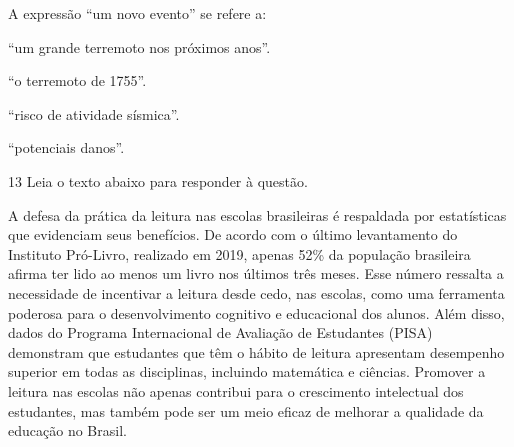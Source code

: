 
A expressão ``um novo evento'' se refere a:

\begin{escolha}
  
  \item ``um grande terremoto nos próximos anos''.
  
  \item ``o terremoto de 1755''.
  
  \item ``risco de atividade sísmica''.
  
  \item ``potenciais danos''.

\end{escolha}

\pagebreak

\num{13} Leia o texto abaixo para responder à questão. 

\begin{myquote}

A defesa da prática da leitura nas escolas brasileiras é respaldada por
estatísticas que evidenciam seus benefícios. De acordo com o último
levantamento do Instituto Pró-Livro, realizado em 2019, apenas 52\% da
população brasileira afirma ter lido ao menos um livro nos últimos três meses.
Esse número ressalta a necessidade de incentivar a leitura desde cedo, nas
escolas, como uma ferramenta poderosa para o desenvolvimento cognitivo e
educacional dos alunos. Além disso, dados do Programa Internacional de
Avaliação de Estudantes (PISA) demonstram que estudantes que têm o hábito de
leitura apresentam desempenho superior em todas as disciplinas, incluindo
matemática e ciências. Promover a leitura nas escolas não apenas
contribui para o crescimento intelectual dos estudantes, mas também pode ser
um meio eficaz de melhorar a qualidade da educação no Brasil.

\end{myquote}


